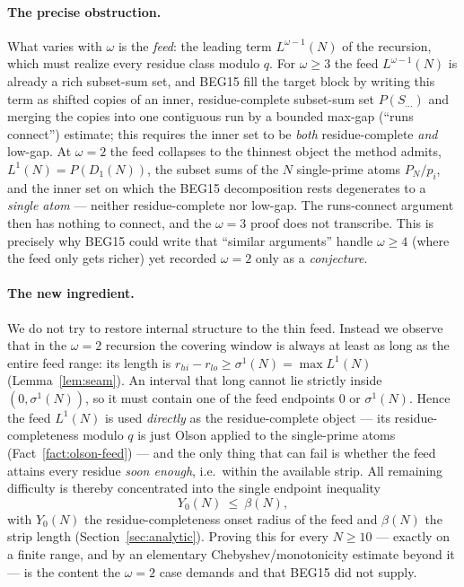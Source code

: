 \documentclass[11pt]{amsart}
\theoremstyle{plain}
\theoremstyle{definition}
\begin{document}
\paragraph{The precise obstruction.}
What varies with $\omega$ is the \emph{feed}: the leading term $L^{\omega-1}(N)$
of the recursion, which must realize every residue class modulo $q$.  For
$\omega\ge 3$ the feed $L^{\omega-1}(N)$ is already a rich subset-sum set, and
BEG15 fill the target block by writing this term as shifted copies of an inner,
residue-complete subset-sum set $P(S_{\dots})$ and merging the copies into one
contiguous run by a bounded max-gap (``runs connect'') estimate; this requires
the inner set to be \emph{both} residue-complete \emph{and} low-gap.  At
$\omega=2$ the feed collapses to the thinnest object the method admits,
$L^1(N)=P(D_1(N))$, the subset sums of the $N$ single-prime atoms $P_N/p_i$, and
the inner set on which the BEG15 decomposition rests degenerates to a
\emph{single atom} --- neither residue-complete nor low-gap.  The runs-connect
argument then has nothing to connect, and the $\omega=3$ proof does not
transcribe.  This is precisely why BEG15 could write that ``similar arguments''
handle $\omega\ge 4$ (where the feed only gets richer) yet recorded $\omega=2$
only as a \emph{conjecture}.

\paragraph{The new ingredient.}
We do not try to restore internal structure to the thin feed.  Instead we observe
that in the $\omega=2$ recursion the covering window is always at least as long as
the entire feed range: its length is $r_{hi}-r_{lo}\ge\sigma^1(N)=\max L^1(N)$
(Lemma~\ref{lem:seam}).  An interval that long cannot lie strictly inside
$(0,\sigma^1(N))$, so it must contain one of the feed endpoints $0$ or
$\sigma^1(N)$.  Hence the feed $L^1(N)$ is used \emph{directly} as the
residue-complete object --- its residue-completeness modulo $q$ is just Olson
applied to the single-prime atoms (Fact~\ref{fact:olson-feed}) --- and the only
thing that can fail is whether the feed attains every residue \emph{soon enough},
i.e.\ within the available strip.  All remaining difficulty is thereby
concentrated into the single endpoint inequality
\[
Y_0(N)\ \le\ \beta(N),
\]
with $Y_0(N)$ the residue-completeness onset radius of the feed and $\beta(N)$ the
strip length (Section~\ref{sec:analytic}).  Proving this for every $N\ge 10$ ---
exactly on a finite range, and by an elementary Chebyshev/monotonicity estimate
beyond it --- is the content the $\omega=2$ case demands and that BEG15 did not
supply.
\end{document}
